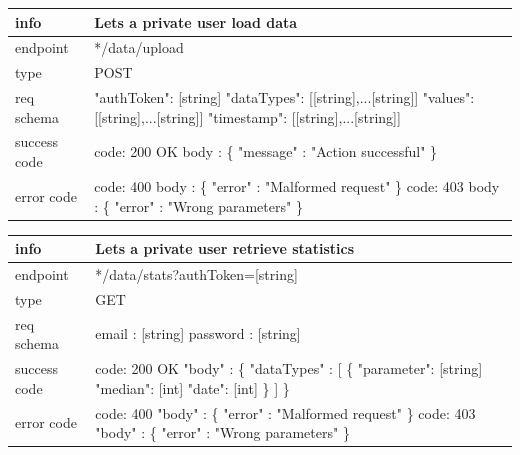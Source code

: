 \documentclass[titlepage]{article}
\begin{document}
\vspace{\baselineskip}

\begin{tabularx}{\textwidth}{lX} \hline
    info & Lets a private user load data \\ \hline
    endpoint & */data/upload \\ \hline
    type & POST \\ \hline
    req schema & 
    "authToken": [string] \newline
    "dataTypes": [[string],...[string]] \newline
    "values": [[string],...[string]] \newline
    "timestamp": [[string],...[string]] \\ \hline
    success code &
        code: 200 OK \newline \newline 
        body : \{ \newline
        "message" : "Action successful" \newline
        \} \\ \hline
    error code &
        code: 400 \newline
        body : \{ "error" : "Malformed request" \} \newline \newline
        code: 403 \newline
        body : \{ "error" : "Wrong parameters" \}\\ \hline
\end{tabularx}
		
\vspace{\baselineskip}

\begin{tabularx}{\textwidth}{lX} \hline
    info & Lets a private user retrieve statistics \\ \hline
    endpoint & */data/stats?authToken=[string] \\ \hline
    type & GET \\ \hline
    req schema & 
        email : [string] \newline
        password : [string] \\ \hline
    success code &
        code: 200 OK \newline \newline 
        "body" : \{ \newline
        "dataTypes" : [\newline
        \{
        "parameter": [string] \newline
        "median": [int] \newline
        "date": [int] \newline
        \}
        ] \newline
        \} \\ \hline
    error code &
        code: 400 \newline
        "body" : \{ "error" : "Malformed request" \} \newline \newline
        code: 403 \newline
        "body" : \{ "error" : "Wrong parameters" \} \\ \hline
\end{tabularx}
		
\end{document}
